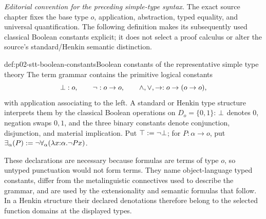 \noindent\textit{Editorial convention for the preceding simple-type syntax.}
The exact source chapter fixes the base type \(o\), application, abstraction,
typed equality, and universal quantification.  The following definition makes
its subsequently used classical Boolean constants explicit; it does not select
a proof calculus or alter the source's standard/Henkin semantic distinction.

\begin{hbdefinition}{def:p02-stt-boolean-constants}{Boolean constants of the representative simple type theory}
The term grammar contains the primitive logical constants
\[
 \bot:o,\qquad
 \neg:o\to o,\qquad
 \land,\lor,\to:o\to(o\to o),
\]
with application associating to the left.  A standard or Henkin type structure
interprets them by the classical Boolean operations on
\(D_o=\{0,1\}\): \(\bot\) denotes \(0\), negation swaps \(0,1\), and the
three binary constants denote conjunction, disjunction, and material
implication.  Put \(\top\mathrel{:=}\neg\bot\); for
\(P:\alpha\to o\), put \(\exists_\alpha(P)\mathrel{:=}
\neg\forall_\alpha(\lambda x{:}\alpha.\neg P x)\).

These declarations are necessary because formulas are terms of type \(o\), so
untyped punctuation would not form terms.  They name object-language typed
constants, differ from the metalinguistic connectives used to describe the
grammar, and are used by the extensionality and semantic formulas that follow.
In a Henkin structure their declared denotations therefore belong to the
selected function domains at the displayed types.
\end{hbdefinition}
